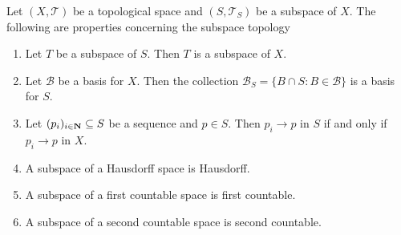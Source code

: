 \begin{proposition}\label{prop: subspace properties}
Let \((X, \mathcal T)\) be a topological space and \((S, \mathcal T_S)\) be a
subspace of \(X\). The following are properties concerning the subspace
topology
\begin{enumerate}[(SP1)]
\item\label{prop: subspace transitivity} Let \(T\) be a subspace of \(S\). Then
  \(T\) is a subspace of \(X\).  \item\label{prop: basis for subspace} Let
  \(\mathcal B\) be a basis for \(X\). Then the collection
  \(\mathcal B_S = \{B \cap S \colon B \in \mathcal B\}\) is a basis for \(S\).
  \item\label{prop: convergence subspace}
    Let \((p_i)_{i \in \mathbf{N}} \subseteq S\) be a sequence and \(p \in
    S\). Then \(p_i \to p\) in \(S\) if and only if \(p_i \to p\) in \(X\).
  \item\label{prop: Hausdorff implies Hausdorff subspace}
    A subspace of a Hausdorff space is Hausdorff.
  \item\label{prop: firs count implies first count subspace}
    A subspace of a first countable space is first countable.
  \item\label{prop: sec count implies sec count subspace}
    A subspace of a second countable space is second countable.
\end{enumerate}
\end{proposition}

